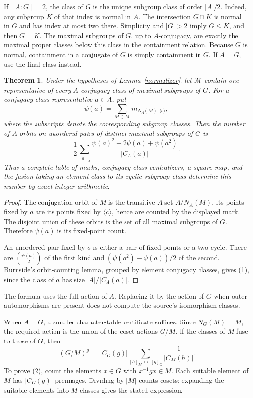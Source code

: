 \documentclass[11pt]{article}
\newtheorem{theorem}{Theorem}
\begin{document}
If $[A:G]=2$, the class of $G$ is the unique subgroup class of order
$|A|/2$. Indeed, any subgroup $K$ of that index is normal in $A$.
The intersection $G\cap K$ is normal in $G$ and has index at most two
there. Simplicity and $|G|>2$ imply $G\leq K$, and then $G=K$.
The maximal subgroups of $G$, up to $A$-conjugacy, are exactly the
maximal proper classes below this class in the containment relation.
Because $G$ is normal, containment in a conjugate of $G$ is simply
containment in $G$. If $A=G$, use the final class instead.

\begin{theorem}\label{count}
Under the hypotheses of Lemma~\ref{normalizer}, let $\mathcal M$
contain one representative of every $A$-conjugacy class of maximal
subgroups of $G$. For a conjugacy class representative $a\in A$, put
\[
 \psi(a)=\sum_{M\in\mathcal M}m_{N_A(M),\langle a\rangle},
\]
where the subscripts denote the corresponding subgroup classes.
Then the number of $A$-orbits on unordered pairs of distinct maximal
subgroups of $G$ is
\[
 \frac12\sum_{[a]_A}
 \frac{\psi(a)^2-2\psi(a)+\psi(a^2)}{|C_A(a)|}.                 \tag{1}
\]
Thus a complete table of marks, conjugacy-class centralizers, a square
map, and the fusion taking an element class to its cyclic subgroup
class determine this number by exact integer arithmetic.
\end{theorem}
\begin{proof}
The conjugation orbit of $M$ is the transitive $A$-set
$A/N_A(M)$. Its points fixed by $a$ are its points fixed by
$\langle a\rangle$, hence are counted by the displayed mark.
The disjoint union of these orbits is the set of all maximal subgroups
of $G$. Therefore $\psi(a)$ is its fixed-point count.

An unordered pair fixed by $a$ is either a pair of fixed points or
a two-cycle. There are $\binom{\psi(a)}2$ of the first kind and
$(\psi(a^2)-\psi(a))/2$ of the second. Burnside's orbit-counting
lemma, grouped by element conjugacy classes, gives (1), since the
class of $a$ has size $|A|/|C_A(a)|$.
\end{proof}
The formula uses the full action of $A$. Replacing it by the action of
$G$ when outer automorphisms are present does not compute the source's
isomorphism classes.

When $A=G$, a smaller character-table certificate suffices. Since
$N_G(M)=M$, the required action is the union of the coset actions
$G/M$. If the classes of $M$ fuse to those of $G$, then
\[
 |(G/M)^g|=|C_G(g)|
     \sum_{[h]_M\,\mapsto\,[g]_G}\frac{1}{|C_M(h)|}.          \tag{2}
\]
To prove (2), count the elements $x\in G$ with $x^{-1}gx\in M$.
Each suitable element of $M$ has $|C_G(g)|$ preimages. Dividing by
$|M|$ counts cosets; expanding the suitable elements into $M$-classes
gives the stated expression.
\end{document}
